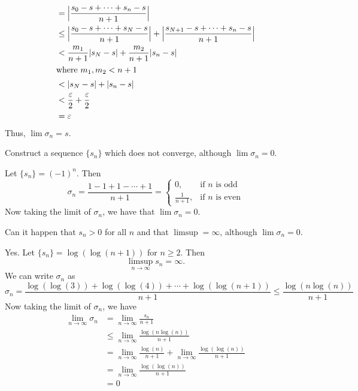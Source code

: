 \begin{exercise}
\begin{exercise}[label = (\alph*), ref = \arabic{exercisei} (\alph*)]
\begin{align*}
      & = \Bigl\lvert\frac{s_0 - s + \cdots + s_n - s}{n + 1}\Bigr\rvert\\
      & \leq \Bigl\lvert\frac{s_0 - s + \cdots + s_N - s}{n + 1}\Bigr\rvert +
        \Bigl\lvert\frac{s_{N + 1} - s + \cdots + s_n - s}{n + 1}\Bigr\rvert\\
      & < \frac{m_1}{n + 1}\lvert s_N - s\rvert + \frac{m_2}{n + 1}
        \lvert s_n - s\rvert\\
      \intertext{where \(m_1,m_2 < n + 1\)}
      & < \lvert s_N - s\rvert + \lvert s_n - s\rvert\\
      & < \frac{\varepsilon}{2} + \frac{\varepsilon}{2}\\
      & = \varepsilon
    \end{align*}
    Thus, \(\lim\sigma_n = s\).
  \item
    Construct a sequence \(\{s_n\}\) which does not converge, although
    \(\lim\sigma_n = 0\).
    \par\smallskip
    Let \(\{s_n\} = (-1)^n\).
    Then
    \[
    \sigma_n = \frac{1 - 1 + 1 - \cdots + 1}{n + 1} =
    \begin{cases}
      0, & \text{if \(n\) is odd}\\
      \frac{1}{n + 1}, & \text{if \(n\) is even}
    \end{cases}
    \]
    Now taking the limit of \(\sigma_n\), we have that \(\lim\sigma_n = 0\).
  \item
    Can it happen that \(s_n > 0\) for all \(n\) and that \(\limsup = \infty\),
    although \(\lim\sigma_n = 0\).
    \par\smallskip
    Yes.
    Let \(\{s_n\} = \log(\log(n + 1))\) for \(n\geq 2\).
    Then
    \[
    \limsup_{n\to\infty} s_n = \infty.
    \]
    We can write \(\sigma_n\) as
    \[
    \sigma_n = \frac{\log(\log(3)) + \log(\log(4)) + \cdots +
      \log(\log(n + 1))}{n + 1}\leq\frac{\log(n\log(n))}{n + 1}
    \]
    Now taking the limit of \(\sigma_n\), we have
    \begin{align*}
      \lim_{n\to\infty}\sigma_n
      & = \lim_{n\to\infty}\frac{s_n}{n + 1}\\
      & \leq \lim_{n\to\infty}\frac{\log(n\log(n))}{n + 1}\\
      & = \lim_{n\to\infty}\frac{\log(n)}{n + 1} +
        \lim_{n\to\infty}\frac{\log(\log(n))}{n + 1}\\
      & = \lim_{n\to\infty}\frac{\log(\log(n))}{n + 1}\\
      & = 0
    \end{align*}
  \item

\end{exercise}
\end{exercise}
